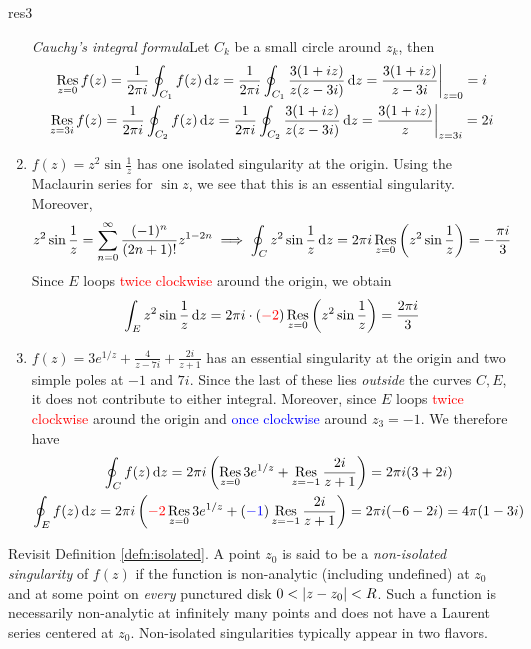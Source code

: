 \begin{examples}{}{res3}
\begin{enumerate}
		\emph{Cauchy's integral formula}\quad Let $C_k$ be a small circle around $z_k$, then
		\begin{gather*}
		  \operatorname*{Res}_{z=0}f(z)=\frac 1{2\pi i}\oint_{C_1}f(z)\,{\mathrm{d} z} 
		  	=\frac 1{2\pi i}\oint_{C_1}\frac{3(1+iz)}{z(z-3i)}\,{\mathrm{d} z} 
		  	=\frac{3(1+iz)}{z-3i}\bigg|_{z=0}=i\\
		  \operatorname*{Res}_{z=3i}f(z)=\frac 1{2\pi i}\oint_{C_2}f(z)\,{\mathrm{d} z} 
		  =\frac 1{2\pi i}\oint_{C_2}\frac{3(1+iz)}{z(z-3i)}\,{\mathrm{d} z} 
		  =\frac{3(1+iz)}{z}\bigg|_{z=3i}=2i
		\end{gather*}
	  \goodbreak
	  
	  \item $f(z)=z^2\sin\frac 1z$ has one isolated singularity at the origin. Using the Maclaurin series for $\sin z$, we see that this is an essential singularity. Moreover,
	  \[
	  	z^2\sin\frac 1z=\sum_{n=0}^\infty \frac{(-1)^n}{(2n+1)!}z^{1-2n} \implies \oint_Cz^2\sin\frac 1z\,{\mathrm{d} z}=2\pi i\operatorname*{Res}_{z=0}\left(z^2\sin\frac 1z\right) =-\frac{\pi i}3
	  \]
	  Since $E$ loops \textcolor{red}{twice clockwise} around the origin, we obtain
	  \[
	  	\int_Ez^2\sin\frac 1z\,{\mathrm{d} z}=2\pi i\cdot (\textcolor{red}{-2})\operatorname*{Res}_{z=0}\left(z^2\sin\frac 1z\right) =\frac{2\pi i}3
	  \]  
	
		\item $f(z)=3e^{1/z}+\frac 4{z-7i}+\frac{2i}{z+1}$ has an essential singularity at the origin and two simple poles at $-1$ and $7i$. Since the last of these lies \emph{outside} the curves $C,E$, it does not contribute to either integral. Moreover, since $E$ loops \textcolor{red}{twice clockwise} around the origin and \textcolor{blue}{once clockwise} around $z_3=-1$. We therefore have
	  \begin{gather*}
	  	\oint_Cf(z)\,{\mathrm{d} z}
	  		=2\pi i\left(\operatorname*{Res}_{z=0}3e^{1/z}+\operatorname*{Res}_{z=-1}\frac{2i}{z+1}\right)
	  	=	2\pi i(3+2i)\\
	  	\oint_Ef(z)\,{\mathrm{d} z}
	  		=2\pi i\left(\textcolor{red}{-2}\operatorname*{Res}_{z=0}3e^{1/z} +(\textcolor{blue}{-1})\operatorname*{Res}_{z=-1}\frac{2i}{z+1}\right)
	  		=2\pi i(-6-2i)=4\pi(1-3i)
	  \end{gather*}
	\end{enumerate}
\end{examples}

\goodbreak


Revisit Definition \ref{defn:isolated}. A point $z_0$ is said to be a \emph{non-isolated singularity} of $f(z)$ if the function is non-analytic (including undefined) at $z_0$ and at some point on \emph{every} punctured disk $0<\left| z-z_0\right|<R$. Such a function is necessarily non-analytic at infinitely many points and does not have a Laurent series centered at $z_0$. Non-isolated singularities typically appear in two flavors.

